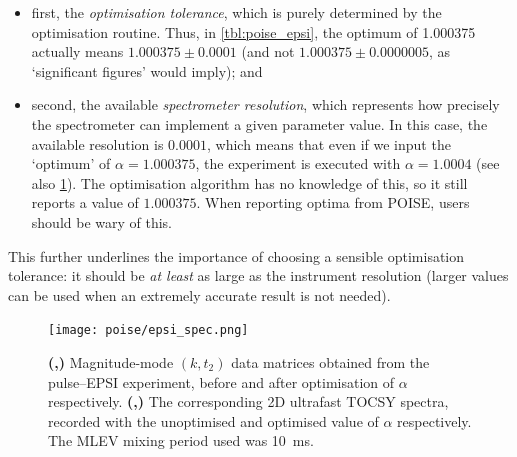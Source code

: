 \begin{itemize}
    \item first, the \textit{optimisation tolerance}, which is purely determined by the optimisation routine. Thus, in \cref{tbl:poise_epsi}, the optimum of 1.000375 actually means $1.000375 \pm 0.0001$ (and not $1.000375 \pm 0.0000005$, as `significant figures' would imply); and
    \item second, the available \textit{spectrometer resolution}, which represents how precisely the spectrometer can implement a given parameter value.
        In this case, the available resolution is $0.0001$, which means that even if we input the `optimum' of $\alpha = 1.000375$, the experiment is executed with $\alpha = 1.0004$ (see also \cref{fig:epsi_spec}).
        The optimisation algorithm has no knowledge of this, so it still reports a value of $1.000375$.
        When reporting optima from POISE, users should be wary of this.
\end{itemize}

This further underlines the importance of choosing a sensible optimisation tolerance: it should be \textit{at least} as large as the instrument resolution (larger values can be used when an extremely accurate result is not needed).

\begin{figure}[htb]
    \centering
    \texttt{[image: poise/epsi\_spec.png]}%
    {\label{fig:epsi_spec_kt_noopt}}%
    {\label{fig:epsi_spec_kt_opt}}%
    {\label{fig:epsi_spec_tocsy_noopt}}%
    {\label{fig:epsi_spec_tocsy_opt}}%
    \caption[Comparison between unoptimised and optimised EPSI spectra]{
        \textbf{(,)} Magnitude-mode $(k, t_2)$ data matrices obtained from the pulse--EPSI experiment, before and after optimisation of $\alpha$ respectively.
        \textbf{(,)} The corresponding 2D ultrafast TOCSY spectra, recorded with the unoptimised and optimised value of $\alpha$ respectively.
        The MLEV mixing period used was \SI{10}{\ms}.
    }
    \label{fig:epsi_spec}
\end{figure}

